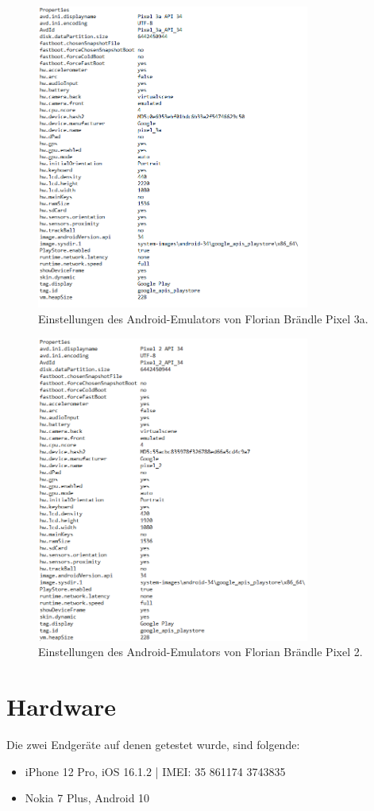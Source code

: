 \begin{figure}[H]
  \centering
  \includegraphics[width=0.8\textwidth]{images/android_emu_fb_1.png}
  \caption{Einstellungen des Android-Emulators von Florian Brändle Pixel 3a.}
\end{figure}

\begin{figure}[H]
  \centering
  \includegraphics[width=0.8\textwidth]{images/android_emu_fb_2.png}
  \caption{Einstellungen des Android-Emulators von Florian Brändle Pixel 2.}
\end{figure}

\section{Hardware}

Die zwei Endgeräte auf denen getestet wurde, sind folgende:

\begin{itemize}
  \item iPhone 12 Pro, iOS 16.1.2 | IMEI: 35 861174 3743835
  \item Nokia 7 Plus, Android 10
\end{itemize}

